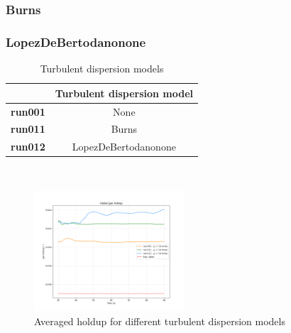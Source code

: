 \documentclass[11pt,a4paper]{article}
\begin{document}
\subsubsection{Burns}

\subsubsection{LopezDeBertodanonone}

\begin{table}[H]
    \centering 
    \begin{tabular}{|p{8em} c |}
    \hline
    \rowcolor{bluePoli!40}
    & \textbf{Turbulent dispersion model} \T\B \\
    \hline \hline
    \textbf{run001} & None \T\B \\
    \textbf{run011} & Burns \T\B \\
    \textbf{run012} & LopezDeBertodanonone \T\B \\
    \hline
    \end{tabular}
    \\[10pt]
    \caption{Turbulent dispersion models}
    \label{table:turbulent_dispersion_models}
\end{table}

\begin{figure}[H]
    \centering
    \includegraphics[width=0.5\textwidth]{Images/graphs/turbdisp/holdUp10.png}
    \caption{Averaged holdup for different turbulent dispersion models}
    \label{fig:holdup_turbdisp}
\end{figure}
\end{document}
